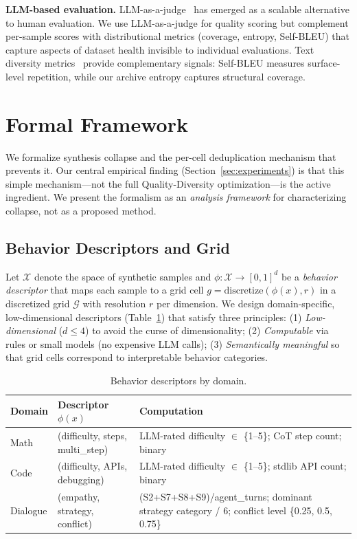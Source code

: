 \documentclass{article}
\begin{document}
\begin{enumerate}[nosep]
\textbf{LLM-based evaluation.}
LLM-as-a-judge~\citep{llm_judge_2023} has emerged as a scalable alternative to human evaluation.
We use LLM-as-a-judge for quality scoring but complement per-sample scores with distributional metrics (coverage, entropy, Self-BLEU) that capture aspects of dataset health invisible to individual evaluations.
Text diversity metrics~\citep{text_diversity_2023, self_bleu_2017} provide complementary signals: Self-BLEU measures surface-level repetition, while our archive entropy captures structural coverage.

\section{Formal Framework}
\label{sec:method}

We formalize synthesis collapse and the per-cell deduplication mechanism that prevents it.
Our central empirical finding (Section~\ref{sec:experiments}) is that this simple mechanism---not the full Quality-Diversity optimization---is the active ingredient.
We present the formalism as an \emph{analysis framework} for characterizing collapse, not as a proposed method.

\subsection{Behavior Descriptors and Grid}

Let $\mathcal{X}$ denote the space of synthetic samples and $\phi: \mathcal{X} \to [0,1]^d$ be a \emph{behavior descriptor} that maps each sample to a grid cell $g = \text{discretize}(\phi(x), r)$ in a discretized grid $\mathcal{G}$ with resolution $r$ per dimension.
We design domain-specific, low-dimensional descriptors (Table~\ref{tab:descriptors}) that satisfy three principles:
(1) \emph{Low-dimensional} ($d \leq 4$) to avoid the curse of dimensionality;
(2) \emph{Computable} via rules or small models (no expensive LLM calls);
(3) \emph{Semantically meaningful} so that grid cells correspond to interpretable behavior categories.

\begin{table}[h]
\centering
\caption{Behavior descriptors by domain.}
\label{tab:descriptors}
\begin{tabular}{llp{5.5cm}}
\toprule
\textbf{Domain} & \textbf{Descriptor $\phi(x)$} & \textbf{Computation} \\
\midrule
Math & (difficulty, steps, multi\_step) & LLM-rated difficulty $\in$ \{1--5\}; CoT step count; binary \\
Code & (difficulty, APIs, debugging) & LLM-rated difficulty $\in$ \{1--5\}; stdlib API count; binary \\
Dialogue & (empathy, strategy, conflict) & (S2+S7+S8+S9)/agent\_turns; dominant strategy category / 6; conflict level \{0.25, 0.5, 0.75\} \\
\bottomrule
\end{tabular}
\end{table}


\end{enumerate}
\end{document}
